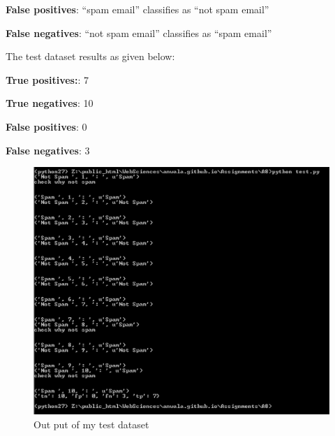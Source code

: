 \documentclass[letterpaper,11pt]{article}
\begin{document}
\textbf{False positives}: “spam email” classifies as “not spam email”

\textbf{False negatives}: “not spam email” classifies as “spam email”





The test dataset results as given below:

\textbf{True positives:}: 7

\textbf{True negatives}: 10

\textbf{False positives}: 0

\textbf{False negatives}: 3



 \begin{figure}[h]
 \centering
 \includegraphics[scale=0.26]{output}
 \caption{Out put of my test dataset}
 \label{fig:dendro}
 \end{figure}
\clearpage





\clearpage

\end{document}
